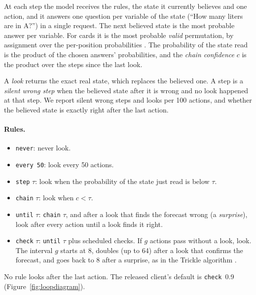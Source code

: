 \documentclass[11pt]{article}
\begin{document}
At each step the model receives the rules, the state it currently believes and one action, and it answers one question
per variable of the state (``How many liters are in A?'') in a single request. The next believed state is the most
probable answer per variable. For cards it is the most probable \emph{valid} permutation, by assignment over the
per-position probabilities \cite{kuhn1955}. The probability of the state read is the product of the chosen answers'
probabilities, and the \emph{chain confidence} $c$ is the product over the steps since the last look.

A \emph{look} returns the exact real state, which replaces the believed one. A step is a \emph{silent wrong step} when
the believed state after it is wrong and no look happened at that step. We report silent wrong steps and looks per
100 actions, and whether the believed state is exactly right after the last action.

\paragraph{Rules.}
\begin{itemize}
  \item \texttt{never}: never look.
  \item \texttt{every 50}: look every 50 actions.
  \item \texttt{step} $\tau$: look when the probability of the state just read is below $\tau$.
  \item \texttt{chain} $\tau$: look when $c<\tau$.
  \item \texttt{until} $\tau$: \texttt{chain} $\tau$, and after a look that finds the forecast wrong (a
  \emph{surprise}), look after every action until a look finds it right.
  \item \texttt{check} $\tau$: \texttt{until} $\tau$ plus scheduled checks. If $g$ actions pass without a look, look.
  The interval $g$ starts at 8, doubles (up to 64) after a look that confirms the forecast, and goes back to 8 after a
  surprise, as in the Trickle algorithm \cite{rfc6206}.
\end{itemize}
No rule looks after the last action. The released client's default is \texttt{check}~0.9 (Figure~\ref{fig:loopdiagram}).
\end{document}
